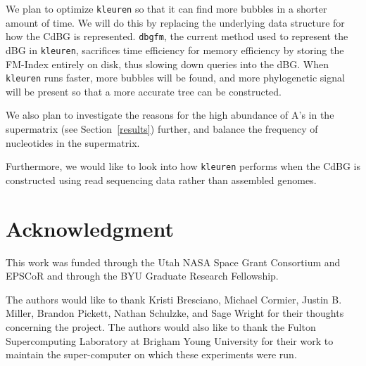 \documentclass[hidelinks, 10pt, conference, compsocconf]{IEEEtran}
\begin{document}
We plan to optimize \texttt{kleuren} so that it can find more bubbles in a shorter amount of time.
We will do this by replacing the underlying data structure for how the CdBG is represented.
\texttt{dbgfm}, the current method used to represent the dBG in \texttt{kleuren}, sacrifices time efficiency for memory efficiency by storing the FM-Index entirely on disk, thus slowing down queries into the dBG.
When \texttt{kleuren} runs faster, more bubbles will be found, and more phylogenetic signal will be present so that a more accurate tree can be constructed. 

We also plan to investigate the reasons for the high abundance of A's in the supermatrix (see Section~\ref{results}) further, and balance the frequency of nucleotides in the supermatrix.

Furthermore, we would like to look into how \texttt{kleuren} performs when the CdBG is constructed using read sequencing data rather than assembled genomes.

\section*{Acknowledgment}

This work was funded through the Utah NASA Space Grant Consortium and EPSCoR and through the BYU Graduate Research Fellowship.

The authors would like to thank Kristi Bresciano, Michael Cormier, Justin B. Miller, Brandon Pickett, Nathan Schulzke, and Sage Wright for their thoughts concerning the project.
The authors would also like to thank the Fulton Supercomputing Laboratory at Brigham Young University for their work to maintain the super-computer on which these experiments were run.

\newpage





%






\end{document}

